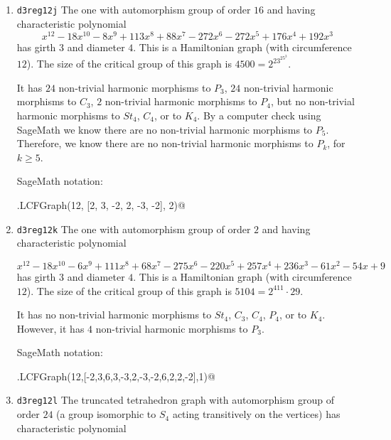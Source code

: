 \documentclass[12pt,letterpaper]{article}
\theoremstyle{definition}
\begin{document}
\begin{enumerate}
It has $42$ non-trivial harmonic morphisms to $C_3$,
$12$ non-trivial harmonic morphisms to $P_3$,
$12$ non-trivial harmonic morphisms to $St_4$,
but no
non-trivial harmonic morphisms to $P_4$, $C_4$, or to $K_4$.

SageMath notation:

\verb@graphs.LCFGraph(12,[2,-3,-2,3,3,3,-3,-3,-3,2,3,-2],1)@


\item
  {\tt d3reg12j}\newline %
The one with automorphism group of order $16$ and
having characteristic polynomial  
\[
x^{12} - 18x^{10} - 8x^9 + 113x^8 + 88x^7 - 272x^6 - 272x^5 + 176x^4 + 192x^3
\]
has girth $3$ and diameter $4$.
This is a Hamiltonian graph (with circumference $12$).
The size of the critical group of this graph is $4500=2^23^25^3$.

It has $24$ non-trivial harmonic morphisms to $P_3$,
$24$ non-trivial harmonic morphisms to $C_3$,
$2$ non-trivial harmonic morphisms to $P_4$, but no
non-trivial harmonic morphisms to $St_4$, $C_4$, or to $K_4$.
By a computer check using SageMath we know there
are no non-trivial harmonic morphisms to $P_5$.
Therefore, we know there
are no non-trivial harmonic morphisms to $P_k$, for $k\geq 5$.

SageMath notation:

\verb@graphs.LCFGraph(12, [2, 3, -2, 2, -3, -2], 2)@


\item
  {\tt d3reg12k}\newline %
The one with automorphism group of order $2$ and
having characteristic polynomial  

\[
x^{12} - 18x^{10} - 6x^9 + 111x^8 + 68x^7 - 275x^6 - 220x^5 + 257x^4 + 236x^3 - 61x^2 - 54x + 9
\]
has girth $3$ and diameter $4$.
This is a Hamiltonian graph (with circumference $12$).
The size of the critical group of this graph is $5104=2^411\cdot 29$.

It has no non-trivial harmonic morphisms to $St_4$, $C_3$, $C_4$, $P_4$, or to $K_4$.
However, it has $4$ non-trivial harmonic morphisms to $P_3$.


SageMath notation:

\verb@graphs.LCFGraph(12,[-2,3,6,3,-3,2,-3,-2,6,2,2,-2],1)@


\item
  {\tt d3reg12l}\newline %
The truncated tetrahedron graph with automorphism group of order $24$
(a group isomorphic to $S_4$ acting transitively on the vertices)
has characteristic polynomial  
  

\end{enumerate}
\end{document}
